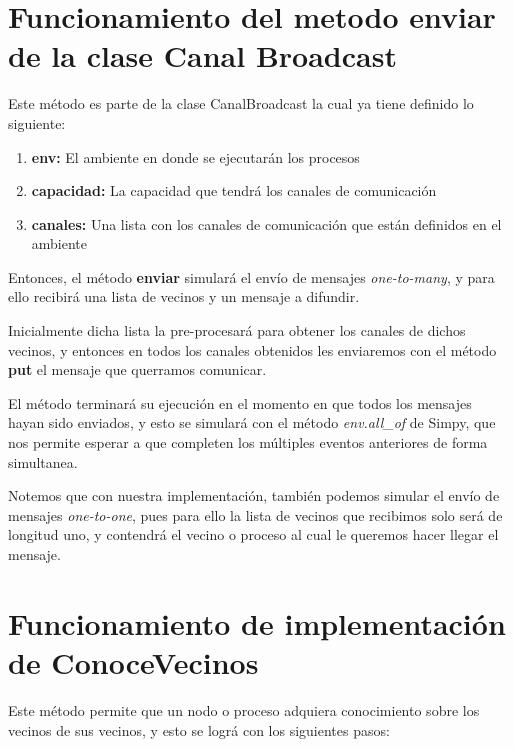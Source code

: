 \section{Funcionamiento del metodo enviar de la clase Canal Broadcast}

Este método es parte de la clase CanalBroadcast la cual ya tiene definido lo siguiente:

\begin{enumerate}
	\item \textbf{env: }
	El ambiente en donde se ejecutarán los procesos
	
	\item \textbf{capacidad: }
	La capacidad que tendrá los canales de comunicación 
	
	\item \textbf{canales: } Una lista con los canales de comunicación que están definidos en el ambiente 
\end{enumerate}

Entonces, el método \textbf{enviar} simulará el envío de mensajes \textit{one-to-many}, y para ello recibirá una lista de vecinos y un mensaje a difundir.

Inicialmente dicha lista la pre-procesará para obtener los canales de dichos vecinos, y entonces en todos los canales obtenidos les enviaremos con el método \textbf{put} el mensaje que querramos comunicar.

El método terminará su ejecución en el momento en que todos los mensajes hayan sido enviados, y esto se simulará con el método \textit{env.all\_of} de Simpy, que nos permite esperar a que completen los múltiples eventos anteriores de forma simultanea.


Notemos que con nuestra implementación, también podemos simular el envío de mensajes \textit{one-to-one}, pues para ello la lista de vecinos que recibimos solo será de longitud uno, y contendrá el vecino o proceso al cual le queremos hacer llegar el mensaje.

\section{Funcionamiento de implementación de ConoceVecinos}

Este método permite que un nodo o proceso adquiera conocimiento sobre los vecinos de sus vecinos, y esto se lográ con los siguientes pasos:

